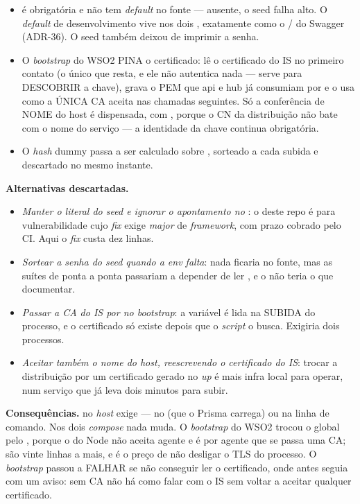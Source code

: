 \begin{itemize}
  \item {} é obrigatória e não tem \emph{default} no fonte ---
    ausente, o seed falha alto. O \emph{default} de desenvolvimento vive nos
    dois , exatamente como o /
    do Swagger (ADR-36). O seed também deixou de imprimir a senha.
  \item O \emph{bootstrap} do WSO2 PINA o certificado: lê o certificado do IS no
    primeiro contato (o único  que resta, e ele
    não autentica nada --- serve para DESCOBRIR a chave), grava o PEM que api e
    hub já consumiam por  e o usa como a ÚNICA CA
    aceita nas chamadas seguintes. Só a conferência de NOME do host é
    dispensada, com , porque o CN da distribuição não
    bate com o nome do serviço --- a identidade da chave continua obrigatória.
  \item O \emph{hash} dummy passa a ser calculado sobre
    , sorteado a cada subida e descartado no mesmo instante.
\end{itemize}

\textbf{Alternativas descartadas.}
\begin{itemize}
  \item \emph{Manter o literal do seed e ignorar o apontamento no
    }: o  deste repo é para vulnerabilidade cujo
    \emph{fix} exige \emph{major} de \emph{framework}, com prazo cobrado pelo
    CI. Aqui o \emph{fix} custa dez linhas.
  \item \emph{Sortear a senha do seed quando a \emph{env} falta}: nada ficaria
    no fonte, mas as suítes de ponta a ponta passariam a depender de ler
    , e o  não teria o que documentar.
  \item \emph{Passar a CA do IS por  no
    \emph{bootstrap}}: a variável é lida na SUBIDA do processo, e o certificado
    só existe depois que o \emph{script} o busca. Exigiria dois processos.
  \item \emph{Aceitar também o nome do host, reescrevendo o certificado do IS}:
    trocar a distribuição por um certificado gerado no \emph{up} é mais infra
    local para operar, num serviço que já leva dois minutos para subir.
\end{itemize}

\textbf{Consequências.}  no \emph{host} exige
 --- no  (que o Prisma carrega) ou na linha
de comando. Nos dois \emph{compose} nada muda. O \emph{bootstrap} do WSO2 trocou
o  global pelo , porque o  do Node não aceita
agente e é por agente que se passa uma CA; são vinte linhas a mais, e é o preço
de não desligar o TLS do processo. O \emph{bootstrap} passou a FALHAR se não
conseguir ler o certificado, onde antes seguia com um aviso: sem CA não há como
falar com o IS sem voltar a aceitar qualquer certificado.

